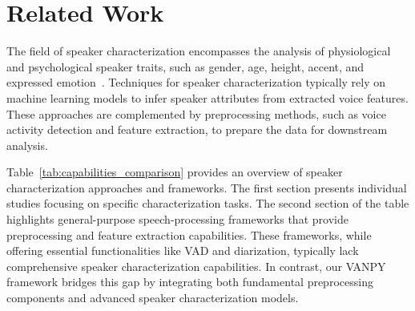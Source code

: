 \section{Related Work}
\label{sec:rw}
The field of speaker characterization encompasses the analysis of physiological and psychological speaker traits, such as gender, age, height, accent, and expressed emotion~\cite{phdthesis_Safavi}. Techniques for speaker characterization typically rely on machine learning models to infer speaker attributes from extracted voice features. These approaches are complemented by preprocessing methods, such as voice activity detection and feature extraction, to prepare the data for downstream analysis.

Table~\ref{tab:capabilities_comparison} provides an overview of speaker characterization approaches and frameworks. The first section presents individual studies focusing on specific characterization tasks.
The second section of the table highlights general-purpose speech-processing frameworks that provide preprocessing and feature extraction capabilities. These frameworks, while offering essential functionalities like VAD and diarization, typically lack comprehensive speaker characterization capabilities. In contrast, our VANPY framework bridges this gap by integrating both fundamental preprocessing components and advanced speaker characterization models.

